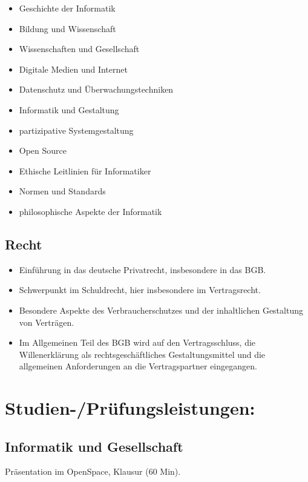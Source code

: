 \begin{itemize}
\tightlist
\item
  Geschichte der Informatik
\item
  Bildung und Wissenschaft
\item
  Wissenschaften und Gesellschaft
\item
  Digitale Medien und Internet
\item
  Datenschutz und Überwachungstechniken
\item
  Informatik und Gestaltung
\item
  partizipative Systemgestaltung
\item
  Open Source
\item
  Ethische Leitlinien für Informatiker
\item
  Normen und Standards
\item
  philosophische Aspekte der Informatik
\end{itemize}

\subsection*{Recht}\label{recht}

\begin{itemize}
\tightlist
\item
  Einführung in das deutsche Privatrecht, insbesondere in das BGB.
\item
  Schwerpunkt im Schuldrecht, hier insbesondere im Vertragsrecht.
\item
  Besondere Aspekte des Verbraucherschutzes und der inhaltlichen
  Gestaltung von Verträgen.
\item
  Im Allgemeinen Teil des BGB wird auf den Vertragsschluss, die
  Willenerklärung als rechtsgeschäftliches Gestaltungsmittel und die
  allgemeinen Anforderungen an die Vertragspartner eingegangen.
\end{itemize}

\section*{Studien-/Prüfungsleistungen:}\label{studien-pruxfcfungsleistungen-14}

\subsection*{Informatik und
Gesellschaft}\label{informatik-und-gesellschaft-1}

Präsentation im OpenSpace, Klausur (60 Min).

